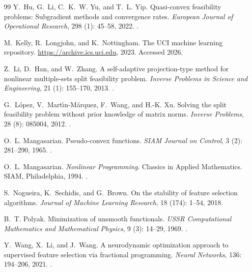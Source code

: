 \documentclass[]{interact}
\theoremstyle{plain}
\theoremstyle{definition}
\theoremstyle{remark}
\begin{document}
\begin{thebibliography}{99}
Y.~Hu, G.~Li, C.~K.~W. Yu, and T.~L. Yip.
\newblock Quasi-convex feasibility problems: Subgradient methods and convergence rates.
\newblock \emph{European Journal of Operational Research}, 298 (1): 45--58, 2022.
\newblock {}.

M.~Kelly, R.~Longjohn, and K.~Nottingham.
\newblock The {UCI} machine learning repository.
\newblock \url{https://archive.ics.uci.edu}, 2023.
\newblock Accessed 2026.

Z.~Li, D.~Han, and W.~Zhang.
\newblock A self-adaptive projection-type method for nonlinear multiple-sets split feasibility problem.
\newblock \emph{Inverse Problems in Science and Engineering}, 21 (1): 155--170, 2013.
\newblock {}.

G.~L{\'o}pez, V.~Mart{\'\i}n-M{\'a}rquez, F.~Wang, and H.-K. Xu.
\newblock Solving the split feasibility problem without prior knowledge of matrix norms.
\newblock \emph{Inverse Problems}, 28 (8): 085004, 2012.
\newblock {}.

O.~L. Mangasarian.
\newblock Pseudo-convex functions.
\newblock \emph{SIAM Journal on Control}, 3 (2): 281--290, 1965.
\newblock {}.

O.~L. Mangasarian.
\newblock \emph{Nonlinear Programming}.
\newblock Classics in Applied Mathematics. SIAM, Philadelphia, 1994.
\newblock {}.

S.~Nogueira, K.~Sechidis, and G.~Brown.
\newblock On the stability of feature selection algorithms.
\newblock \emph{Journal of Machine Learning Research}, 18 (174): 1--54, 2018.

B.~T. Polyak.
\newblock Minimization of unsmooth functionals.
\newblock \emph{USSR Computational Mathematics and Mathematical Physics}, 9 (3): 14--29, 1969.
\newblock {}.

Y.~Wang, X.~Li, and J.~Wang.
\newblock A neurodynamic optimization approach to supervised feature selection via fractional programming.
\newblock \emph{Neural Networks}, 136: 194--206, 2021.
\newblock {}.


\end{thebibliography}
\end{document}

